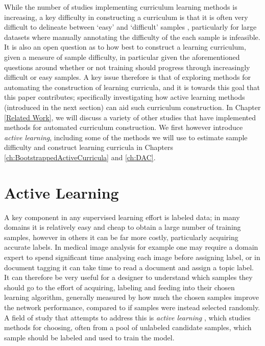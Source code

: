 While the number of studies implementing curriculum learning methods is increasing, a key difficulty in constructing a curriculum is that it is often very difficult to delineate between `easy' and `difficult' samples \cite{Bengio2009}, particularly for large datasets where manually annotating the difficulty of the each sample is infeasible. It is also an open question as to how best to construct a learning curriculum, given a measure of sample difficulty, in particular given the aforementioned questions around whether or not training should progress through increasingly difficult or easy samples. A key issue therefore is that of exploring methods for automating the construction of learning curricula, and it is towards this goal that this paper contributes; specifically investigating how active learning methods (introduced in the next section) can aid such curriculum construction. In Chapter \ref{Related Work}, we will discuss a variety of other studies that have implemented methods for automated curriculum construction. We first however introduce \textit{active learning}, including some of the methods we will use to estimate sample difficulty and construct learning curricula in Chapters \ref{ch:BootstrappedActiveCurricula} and \ref{ch:DAC}.


\section{Active Learning}\label{Background_ActiveLearning}
A key component in any supervised learning effort is labeled data; in many domains it is relatively easy and cheap to obtain a large number of training samples, however in others it can be far more costly, particularly acquiring accurate labels. In medical image analysis for example one may require a domain expert to spend significant time analysing each image before assigning label, or in document tagging it can take time to read a document and assign a topic label. It can therefore be very useful for a designer to understand which samples they should go to the effort of acquiring, labeling and feeding into their chosen learning algorithm, generally measured by how much the chosen samples improve the network performance, compared to if samples were instead selected randomly. A field of study that attempts to address this is \textit{active learning} \cite{settles2012active} \cite{cohn1994improving} \cite{cohn1996active}, which studies methods for choosing, often from a pool of unlabeled candidate samples, which sample should be labeled and used to train the model.

